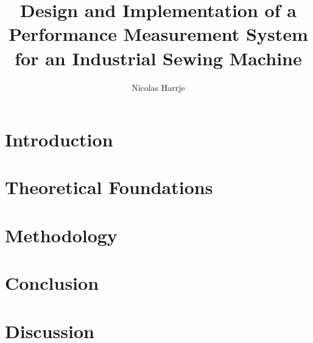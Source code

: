 \documentclass[11pt]{report}
\title{\textbf{Design and Implementation of a Performance Measurement System for an Industrial Sewing Machine}}
\author{Nicolas Harrje}
\date{}
\begin{document}
\maketitle
\thispagestyle{empty}

\tableofcontents
\newpage

\chapter{Introduction}
\chapter{Theoretical Foundations}

\chapter{Methodology}
\chapter{Conclusion}
\chapter{Discussion}



\end{document}
